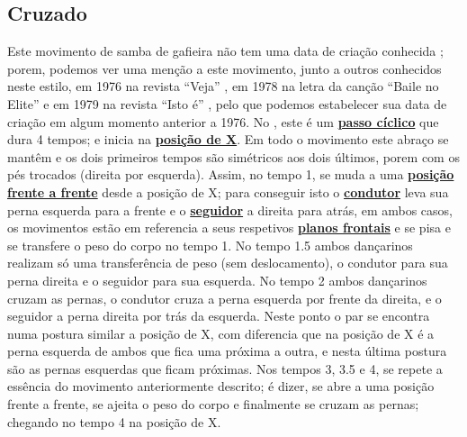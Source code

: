 \subsection{Cruzado}
Este movimento de samba de gafieira não tem uma data de criação conhecida \cite[pp. 143]{perna2002samba};
porem, podemos ver uma menção a este movimento, junto a outros conhecidos neste estilo,
em 1976 na revista ``Veja'' \cite[pp. 158]{1976veja},
em 1978 na letra da canção ``Baile no Elite'' \cite{BaileNoElite}  e 
em 1979 na revista ``Isto é'' \cite[pp. 89]{revista1979isto},
pelo que podemos estabelecer sua data de criação em algum momento anterior a 1976.
No \AnoLivro, este é um \hyperref[def:PassoCiclico]{\textbf{passo cíclico}} que dura 4 tempos;
e inicia na \hyperref[def:X-position]{\textbf{posição de X}}.
Em todo o movimento este abraço se mantêm e os dois primeiros tempos 
são simétricos aos dois últimos, porem com os pés trocados (direita por esquerda). 
Assim, no tempo 1, 
se muda a uma \hyperref[def:frente-frente-position]{\textbf{posição frente a frente}} desde a posição de X;
para conseguir isto o \hyperref[def:Condutor]{\textbf{condutor}} 
leva sua perna esquerda para a frente e o \hyperref[def:Seguidor]{\textbf{seguidor}}  a direita para atrás,
em ambos casos, os movimentos estão em referencia a seus 
respetivos \hyperref[def:PlanoFrontal]{\textbf{planos frontais}} e 
se pisa e se transfere o peso do corpo no tempo 1.
No tempo 1.5 ambos dançarinos realizam só uma transferência de peso (sem deslocamento),
o condutor para sua perna direita e o seguidor para sua esquerda.
No tempo 2 ambos dançarinos cruzam as pernas, 
o condutor cruza a perna esquerda por frente da direita, e o seguidor a perna direita por trás da esquerda.
Neste ponto o par se encontra numa postura similar a posição de X, 
com diferencia que na posição de X é a perna esquerda de ambos que fica uma próxima a outra,
e nesta última postura são as pernas esquerdas que ficam próximas.
Nos tempos 3, 3.5 e 4, se repete a essência do movimento anteriormente descrito;
é dizer, se abre a uma posição frente a frente, se ajeita o peso do corpo e finalmente se cruzam as pernas;
chegando no tempo 4 na posição de X.


